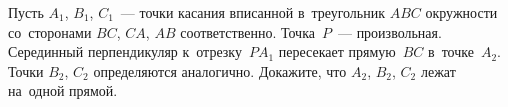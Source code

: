 \begin{problems}
\item
Пусть $A_1$, $B_1$, $C_1$~--- точки касания вписанной в~треугольник $ABC$
окружности со~сторонами $BC$, $CA$, $AB$ соответственно.
Точка~$P$~--- произвольная.
Серединный перпендикуляр к~отрезку~$P A_1$ пересекает прямую~$BC$
в~точке~$A_2$.
Точки $B_2$, $C_2$ определяются аналогично.
Докажите, что $A_2$, $B_2$, $C_2$ лежат на~одной прямой.


\end{problems}

